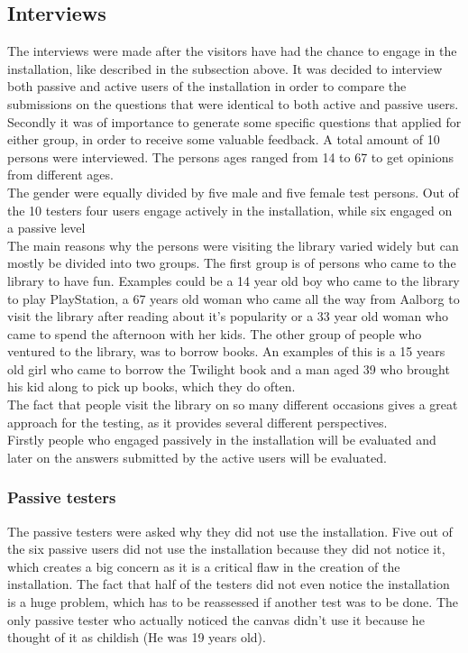 \subsection{Interviews}
The interviews were made after the visitors have had the chance to engage in the installation, like described in the subsection above. It was decided to interview both passive and active users of the installation in order to compare the submissions on the questions that were identical to both active and passive users. Secondly it was of importance to generate some specific questions that applied for either group, in order to receive some valuable feedback. A total amount of 10 persons were interviewed. The persons ages ranged from 14 to 67 to get opinions from different ages.\\
The gender were equally divided by five male and five female test persons. Out of the 10 testers four users engage actively in the installation, while six engaged on a passive level\\
The main reasons why the persons were visiting the library varied widely but can mostly be divided into two groups. The first group is of persons who came to the library to have fun. Examples could be a 14 year old boy who came to the library to play PlayStation, a 67 years old woman who came all the way from Aalborg to visit the library after reading about it's popularity or a 33 year old woman who came to spend the afternoon with her kids. The other group of people who ventured to the library, was to borrow books. An examples of this is a 15 years old girl who came to borrow the Twilight book and a man aged 39 who brought his kid along to pick up books, which they do often.\\
The fact that people visit the library on so many different occasions gives a great approach for the testing, as it provides several different perspectives.\\
Firstly people who engaged passively in the installation will be evaluated and later on the answers submitted by the active users will be evaluated.\\

\subsubsection{Passive testers}
The passive testers were asked why they did not use the installation. Five out of the six passive users did not use the installation because they did not notice it, which creates a big concern as it is a critical flaw in the creation of the installation. The fact that half of the testers did not even notice the installation is a huge problem, which has to be reassessed if another test was to be done. The only passive tester who actually noticed the canvas didn't use it because he thought of it as childish (He was 19 years old).

